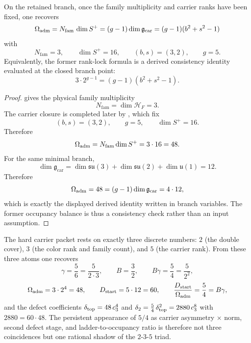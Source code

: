 \begin{proposition}[Derived \texorpdfstring{$48=4\cdot12$}{48=4·12} identity on the retained branch]
\label{prop:rank-lock}
On the retained branch, once the family multiplicity and carrier ranks have been fixed, one
recovers
\[
\Omega_{\mathrm{adm}}
=
N_{\mathrm{fam}}\,\dim S^+
=
(g-1)\dim\mathfrak g_{\mathrm{car}}
=
(g-1)(b^2+s^2-1)
\]
with
\[
N_{\mathrm{fam}}=3,
\qquad
\dim S^+=16,
\qquad
(b,s)=(3,2),
\qquad
g=5.
\]
Equivalently, the former rank-lock formula is a derived consistency identity evaluated at the
closed branch point:
\begin{equation}
\label{eq:rank-lock}
3\cdot 2^{g-1}=(g-1)(b^2+s^2-1).
\end{equation}
\end{proposition}

\begin{proof}
 gives the physical family multiplicity
\[
N_{\mathrm{fam}}=\dim\mathcal H_F=3.
\]
The carrier closure is completed later by , which
fix
\[
(b,s)=(3,2),
\qquad
g=5,
\qquad
\dim S^+=16.
\]
Therefore
\[
\Omega_{\mathrm{adm}}=N_{\mathrm{fam}}\dim S^+=3\cdot16=48.
\]
For the same minimal branch,
\[
\dim\mathfrak g_{\mathrm{car}}
=
\dim\mathfrak{su}(3)+\dim\mathfrak{su}(2)+\dim\mathfrak u(1)
=
12.
\]
Therefore
\[
\Omega_{\mathrm{adm}}=48=(g-1)\dim\mathfrak g_{\mathrm{car}}=4\cdot 12,
\]
which is exactly the displayed derived identity written in branch variables. The former occupancy
balance is thus a consistency check rather than an input assumption.
\end{proof}

\begin{remark}
The hard carrier packet rests on exactly three discrete numbers: $2$ (the double cover), $3$ (the color rank and family count), and $5$ (the carrier rank). From these three atoms one recovers
\[
\gamma=\frac{5}{6}=\frac{5}{2\cdot 3},
\qquad
B=\frac{3}{2},
\qquad
B\gamma=\frac{5}{4}=\frac{5}{2^2},
\]
\[
\Omega_{\mathrm{adm}}=3\cdot 2^4=48,
\qquad
D_{\mathrm{start}}=5\cdot 12=60,
\qquad
\frac{D_{\mathrm{start}}}{\Omega_{\mathrm{adm}}}=\frac{5}{4}=B\gamma,
\]
and the defect coefficients $\delta_{\mathrm{top}}=48\,c_3^4$ and $\delta_2=\frac54\,\delta_{\mathrm{top}}^2=2880\,c_3^8$ with $2880=60\cdot 48$.
The persistent appearance of $5/4$ as carrier asymmetry $\times$ norm, second defect stage, and ladder-to-occupancy ratio is therefore not three coincidences but one rational shadow of the $2$-$3$-$5$ triad.
\end{remark}


